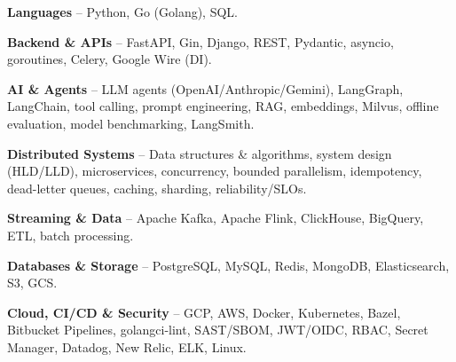 \begin{zitemize}
\item \textbf{Languages} -- Python, Go (Golang), SQL.
\item \textbf{Backend \& APIs} -- FastAPI, Gin, Django, REST, Pydantic, asyncio, goroutines, Celery, Google Wire (DI).
\item \textbf{AI \& Agents} -- LLM agents (OpenAI/Anthropic/Gemini), LangGraph, LangChain, tool calling, prompt engineering, RAG, embeddings, Milvus, offline evaluation, model benchmarking, LangSmith.
\item \textbf{Distributed Systems} -- Data structures \& algorithms, system design (HLD/LLD), microservices, concurrency, bounded parallelism, idempotency, dead-letter queues, caching, sharding, reliability/SLOs.
\item \textbf{Streaming \& Data} -- Apache Kafka, Apache Flink, ClickHouse, BigQuery, ETL, batch processing.
\item \textbf{Databases \& Storage} -- PostgreSQL, MySQL, Redis, MongoDB, Elasticsearch, S3, GCS.
\item \textbf{Cloud, CI/CD \& Security} -- GCP, AWS, Docker, Kubernetes, Bazel, Bitbucket Pipelines, golangci-lint, SAST/SBOM, JWT/OIDC, RBAC, Secret Manager, Datadog, New Relic, ELK, Linux.
\end{zitemize}
